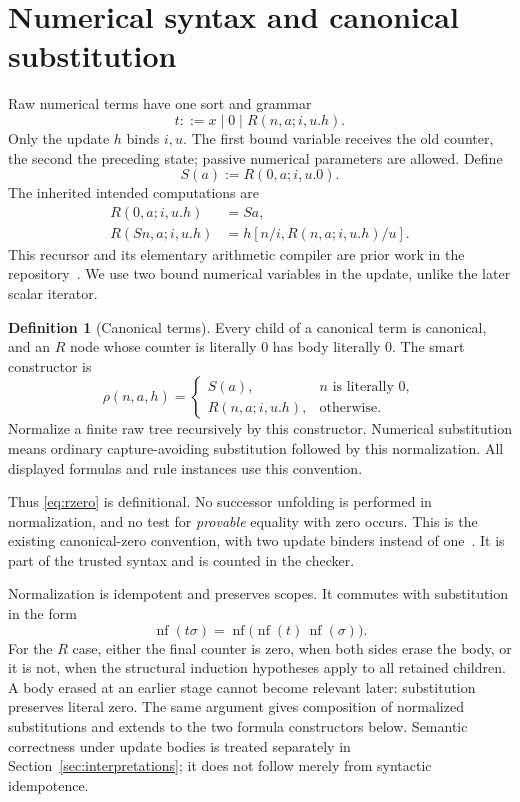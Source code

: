 \documentclass[11pt,letterpaper]{article}
\theoremstyle{definition}
\newtheorem{definition}[theorem]{Definition}
\newcommand{\nf}{\mathop{\mathrm{nf}}}
\begin{document}
\section{Numerical syntax and canonical substitution}
\label{sec:syntax}

Raw numerical terms have one sort and grammar
\[
 t ::= x\mid 0\mid R(n,a;i,u.h).
\]
Only the update $h$ binds $i,u$. The first bound variable receives the
old counter, the second the preceding state; passive numerical
parameters are allowed. Define
\[
                         S(a):=R(0,a;i,u.0).
\]
The inherited intended computations are
\begin{align}
 R(0,a;i,u.h)&=Sa, \label{eq:rzero}\\
 R(Sn,a;i,u.h)&=h[n/i,R(n,a;i,u.h)/u]. \label{eq:rsucc}
\end{align}
This recursor and its elementary arithmetic compiler are prior work
in the repository~\cite{counter,scalar}. We use two bound numerical
variables in the update, unlike the later scalar iterator.

\begin{definition}[Canonical terms]
Every child of a canonical term is canonical, and an $R$ node whose
counter is literally $0$ has body literally $0$. The smart constructor is
\[
 \rho(n,a,h)=
 \begin{cases}S(a),&n\text{ is literally }0,\\
 R(n,a;i,u.h),&\text{otherwise}.
 \end{cases}
\]
Normalize a finite raw tree recursively by this constructor. Numerical
substitution means ordinary capture-avoiding substitution followed by
this normalization. All displayed formulas and rule instances use
this convention.
\end{definition}

Thus \eqref{eq:rzero} is definitional. No successor unfolding is
performed in normalization, and no test for \emph{provable} equality
with zero occurs. This is the existing canonical-zero convention,
with two update binders instead of one~\cite{canonical}.
It is part of the trusted syntax and is counted in the checker.

Normalization is idempotent and preserves scopes. It commutes with
substitution in the form
\[
 \nf(t\sigma)=\nf\bigl(\nf(t)\,\nf(\sigma)\bigr).
\]
For the $R$ case, either the final counter is zero, when both sides erase
the body, or it is not, when the structural induction hypotheses apply
to all retained children. A body erased at an earlier stage cannot
become relevant later: substitution preserves literal zero. The same
argument gives composition of normalized substitutions and extends to
the two formula constructors below. Semantic correctness under update
bodies is treated separately in Section~\ref{sec:interpretations}; it
does not follow merely from syntactic idempotence.
\end{document}
